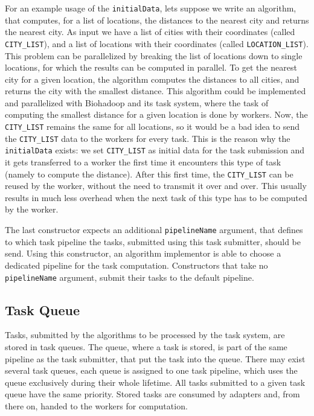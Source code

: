   For an example usage of the \texttt{initialData}, lets suppose we write an algorithm, that computes, for a list of locations, the distances to the nearest city and returns the nearest city. As input we have a list of cities with their coordinates (called \texttt{CITY\_LIST}), and a list of locations with their coordinates (called \texttt{LOCATION\_LIST}). This problem can be parallelized by breaking the list of locations down to single locations, for which the results can be computed in parallel. To get the nearest city for a given location, the algorithm computes the distances to all cities, and returns the city with the smallest distance. This algorithm could be implemented and parallelized with Biohadoop and its task system, where the task of computing the smallest distance for a given location is done by workers. Now, the \texttt{CITY\_LIST} remains the same for all locations, so it would be a bad idea to send the \texttt{CITY\_LIST} data to the workers for every task. This is the reason why the \texttt{initialData} exists: we set \texttt{CITY\_LIST} as initial data for the task submission and it gets transferred to a worker the first time it encounters this type of task (namely to compute the distance). After this first time, the \texttt{CITY\_LIST} can be reused by the worker, without the need to transmit it over and over. This usually results in much less overhead when the next task of this type has to be computed by the worker.
  
  The last constructor expects an additional \texttt{pipelineName} argument, that defines to which task pipeline the tasks, submitted using this task submitter, should be send. Using this constructor, an algorithm implementor is able to choose a dedicated pipeline for the task computation. Constructors that take no \texttt{pipelineName} argument, submit their tasks to the default pipeline.
  
  \subsection{Task Queue}
  Tasks, submitted by the algorithms to be processed by the task system, are stored in task queues. The queue, where a task is stored, is part of the same pipeline as the task submitter, that put the task into the queue. There may exist several task queues, each queue is assigned to one task pipeline, which uses the queue exclusively during their whole lifetime. All tasks submitted to a given task queue have the same priority. Stored tasks are consumed by adapters and, from there on, handed to the workers for computation.
  
